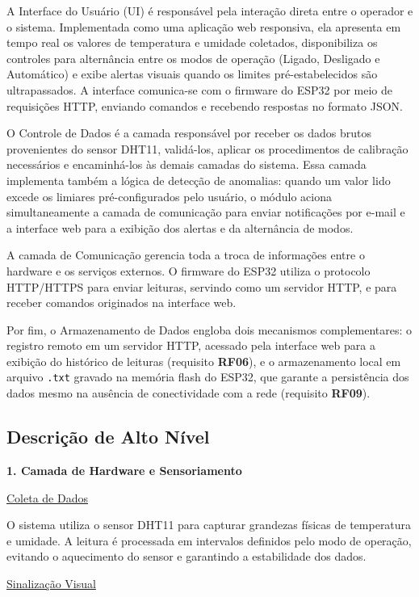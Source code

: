  A Interface do Usuário (UI) é responsável pela interação direta entre o operador e o sistema. Implementada como uma aplicação web responsiva, ela apresenta em tempo real os valores de temperatura e umidade coletados, disponibiliza os controles para alternância entre os modos de operação (Ligado, Desligado e Automático) e exibe alertas visuais quando os limites pré-estabelecidos são ultrapassados. A interface comunica-se com o firmware do ESP32 por meio de requisições HTTP, enviando comandos e recebendo respostas no formato JSON.

O Controle de Dados é a camada responsável por receber os dados brutos provenientes do sensor DHT11, validá-los, aplicar os procedimentos de calibração necessários e encaminhá-los às demais camadas do sistema. Essa camada implementa também a lógica de detecção de anomalias: quando um valor lido excede os limiares pré-configurados pelo usuário, o módulo aciona simultaneamente a camada de comunicação para enviar notificações por e-mail e a interface web para a exibição dos alertas e da alternância de modos.

A camada de Comunicação gerencia toda a troca de informações entre o hardware e os serviços externos. O firmware do ESP32 utiliza o protocolo HTTP/HTTPS para enviar leituras, servindo como um servidor HTTP, e para receber comandos originados na interface web.

Por fim, o Armazenamento de Dados engloba dois mecanismos complementares: o registro remoto em um servidor HTTP, acessado pela interface web para a exibição do histórico de leituras (requisito \textbf{RF06}), e o armazenamento local em arquivo \texttt{.txt} gravado na memória flash do ESP32, que garante a persistência dos dados mesmo na ausência de conectividade com a rede (requisito \textbf{RF09}).

\subsection{Descrição de Alto Nível}

\textbf{1. Camada de Hardware e Sensoriamento}

\underline{Coleta de Dados}

    O sistema utiliza o sensor DHT11 para capturar grandezas físicas de temperatura e umidade. A leitura é processada em intervalos definidos pelo modo de operação, evitando o aquecimento do sensor e garantindo a estabilidade dos dados.

\underline{Sinalização Visual}

